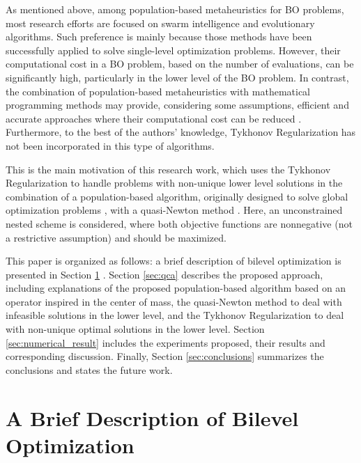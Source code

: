 \documentclass[conference]{IEEEtran}
\theoremstyle{definition}
\begin{document}
As mentioned above, among population-based metaheuristics for BO problems, most
research efforts are focused on swarm intelligence and evolutionary algorithms.
Such preference is mainly because those methods have been successfully applied
to solve single-level optimization problems. However, their computational cost
in a BO problem, based on the number of evaluations, can be significantly high,
particularly in the lower level of the BO problem. In contrast, the combination
of population-based metaheuristics with mathematical programming methods may
provide, considering some assumptions, efficient and accurate approaches where
their computational cost can be reduced \cite{sinha2013efficient,wang2005evolutionary}.
Furthermore, to the best of the authors' knowledge, Tykhonov Regularization has
not been incorporated in this type of algorithms. 

This is the main motivation of this research work, which uses the Tykhonov
Regularization \cite{dempe2002foundations} to handle problems with non-unique
lower level solutions in the combination of a population-based algorithm, originally
designed to solve global optimization problems \cite{Mejia2018}, with a quasi-Newton
method \cite{fletcher2013practical}. Here, an unconstrained nested scheme is
considered, where both objective functions are nonnegative (not a restrictive
assumption) and should be maximized.

This paper is organized as follows: a brief description of bilevel optimization
is presented in Section \ref{sec:a_brief_BO} . Section \ref{sec:qca} describes the proposed
approach, including explanations of the proposed population-based algorithm based
on an operator inspired in the center of mass, the quasi-Newton method to deal
with infeasible solutions in the lower level, and the Tykhonov Regularization to
deal with non-unique optimal solutions in the lower level. Section \ref{sec:numerical_result}
includes the experiments proposed, their results and corresponding discussion.
Finally, Section \ref{sec:conclusions} summarizes the conclusions and states
the future work.


\section{A Brief Description of Bilevel Optimization} %
\label{sec:a_brief_BO}
\end{document}
